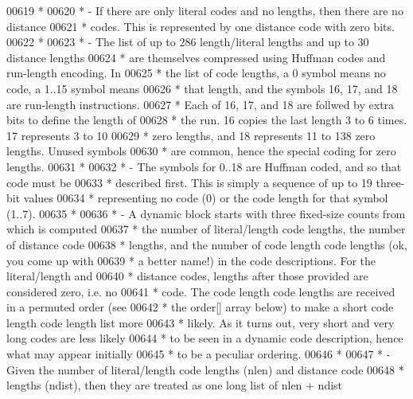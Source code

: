 \begin{DoxyCode}
00619 \textcolor{comment}{ *}
00620 \textcolor{comment}{ * - If there are only literal codes and no lengths, then there are no distance}
00621 \textcolor{comment}{ *   codes.  This is represented by one distance code with zero bits.}
00622 \textcolor{comment}{ *}
00623 \textcolor{comment}{ * - The list of up to 286 length/literal lengths and up to 30 distance lengths}
00624 \textcolor{comment}{ *   are themselves compressed using Huffman codes and run-length encoding.  In}
00625 \textcolor{comment}{ *   the list of code lengths, a 0 symbol means no code, a 1..15 symbol means}
00626 \textcolor{comment}{ *   that length, and the symbols 16, 17, and 18 are run-length instructions.}
00627 \textcolor{comment}{ *   Each of 16, 17, and 18 are follwed by extra bits to define the length of}
00628 \textcolor{comment}{ *   the run.  16 copies the last length 3 to 6 times.  17 represents 3 to 10}
00629 \textcolor{comment}{ *   zero lengths, and 18 represents 11 to 138 zero lengths.  Unused symbols}
00630 \textcolor{comment}{ *   are common, hence the special coding for zero lengths.}
00631 \textcolor{comment}{ *}
00632 \textcolor{comment}{ * - The symbols for 0..18 are Huffman coded, and so that code must be}
00633 \textcolor{comment}{ *   described first.  This is simply a sequence of up to 19 three-bit values}
00634 \textcolor{comment}{ *   representing no code (0) or the code length for that symbol (1..7).}
00635 \textcolor{comment}{ *}
00636 \textcolor{comment}{ * - A dynamic block starts with three fixed-size counts from which is computed}
00637 \textcolor{comment}{ *   the number of literal/length code lengths, the number of distance code}
00638 \textcolor{comment}{ *   lengths, and the number of code length code lengths (ok, you come up with}
00639 \textcolor{comment}{ *   a better name!) in the code descriptions.  For the literal/length and}
00640 \textcolor{comment}{ *   distance codes, lengths after those provided are considered zero, i.e. no}
00641 \textcolor{comment}{ *   code.  The code length code lengths are received in a permuted order (see}
00642 \textcolor{comment}{ *   the order[] array below) to make a short code length code length list more}
00643 \textcolor{comment}{ *   likely.  As it turns out, very short and very long codes are less likely}
00644 \textcolor{comment}{ *   to be seen in a dynamic code description, hence what may appear initially}
00645 \textcolor{comment}{ *   to be a peculiar ordering.}
00646 \textcolor{comment}{ *}
00647 \textcolor{comment}{ * - Given the number of literal/length code lengths (nlen) and distance code}
00648 \textcolor{comment}{ *   lengths (ndist), then they are treated as one long list of nlen + ndist}

\end{DoxyCode}
